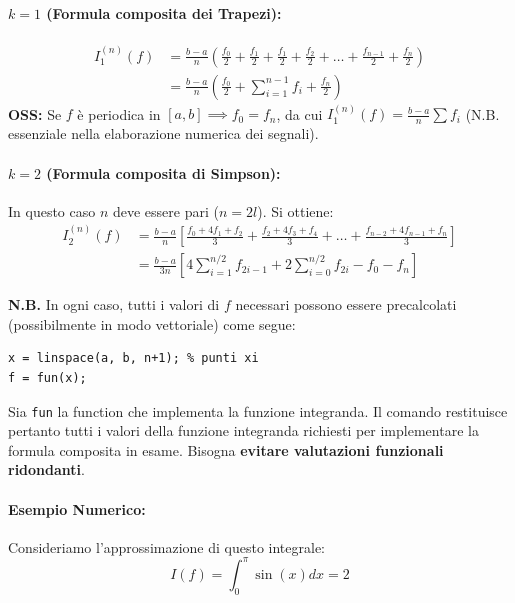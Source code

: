 \paragraph{$k=1$ (Formula composita dei Trapezi):}
\begin{align} \label{eq:trapezi_esplicita}
I_1^{(n)}(f) &= \frac{b-a}{n} \left( \frac{f_0}{2} + \frac{f_1}{2} + \frac{f_1}{2} + \frac{f_2}{2} + \dots + \frac{f_{n-1}}{2} + \frac{f_n}{2} \right) \nonumber \\
&= \frac{b-a}{n} \left( \frac{f_0}{2} + \sum_{i=1}^{n-1} f_i + \frac{f_n}{2} \right)
\end{align}
\textbf{OSS:} Se $f$ è periodica in $[a,b] \implies f_0 = f_n$, da cui $I_1^{(n)}(f) = \frac{b-a}{n} \sum f_i$ (N.B. essenziale nella elaborazione numerica dei segnali).

\paragraph{$k=2$ (Formula composita di Simpson):}
In questo caso $n$ deve essere pari ($n = 2l$). Si ottiene:
\begin{align} \label{eq:simpson_esplicita}
I_2^{(n)}(f) &= \frac{b-a}{n} \left[ \frac{f_0 + 4f_1 + f_2}{3} + \frac{f_2 + 4f_3 + f_4}{3} + \dots + \frac{f_{n-2} + 4f_{n-1} + f_n}{3} \right] \nonumber \\
&= \frac{b-a}{3n} \left[ 4\sum_{i=1}^{n/2} f_{2i-1} + 2\sum_{i=0}^{n/2} f_{2i} - f_0 - f_n \right]
\end{align}

\vspace{0.6cm}
\textbf{N.B.} In ogni caso, tutti i valori di $f$ necessari possono essere precalcolati (possibilmente in modo vettoriale) come segue:
\begin{verbatim}
x = linspace(a, b, n+1); % punti xi
f = fun(x);
\end{verbatim}
Sia \texttt{fun} la function che implementa la funzione integranda. Il comando restituisce pertanto tutti i valori della funzione integranda richiesti per implementare la formula composita in esame. Bisogna \textbf{evitare valutazioni funzionali ridondanti}.

\vspace{0.6cm}
\paragraph{Esempio Numerico:}
Consideriamo l'approssimazione di questo integrale:
\begin{equation}
I(f) = \int_{0}^{\pi} \sin(x) dx = 2
\end{equation}

